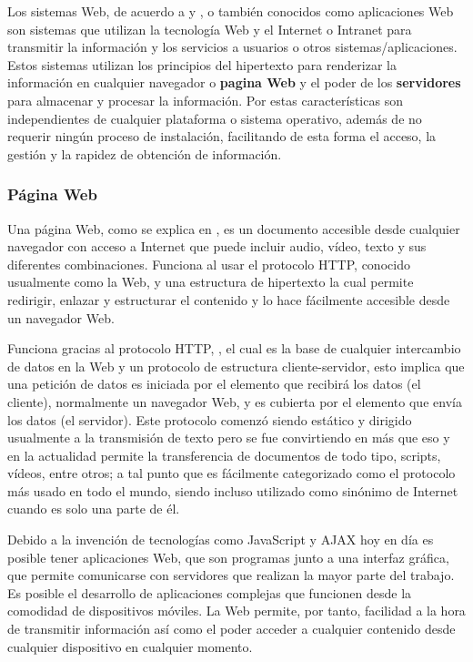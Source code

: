 Los sistemas Web, de acuerdo a \cite{SistWeb1} y \cite{wiki:systemWeb}, o
también conocidos como aplicaciones Web son sistemas que
utilizan la tecnología Web y el Internet o Intranet para transmitir la
información y los
servicios a usuarios o otros sistemas/aplicaciones. Estos sistemas utilizan los
principios del hipertexto para renderizar la información en cualquier
navegador o \textbf{pagina Web} y el poder de los \textbf{servidores} para
almacenar y procesar la información. Por estas características son independientes
de cualquier plataforma o sistema operativo, además de  no requerir ningún
proceso de instalación, facilitando de esta forma el acceso, la gestión y la
rapidez de obtención de información.



\subsubsection*{Página Web}
Una página Web, como se explica en \cite{webpageMozila},  es un documento
accesible desde cualquier navegador con acceso
a Internet que puede incluir audio, vídeo, texto y sus diferentes
combinaciones.
Funciona al usar el protocolo HTTP, conocido usualmente como la Web, y una
estructura de hipertexto la cual permite redirigir, enlazar y estructurar el
contenido y lo hace fácilmente accesible desde un navegador Web.

Funciona gracias al protocolo HTTP, ,
el cual es la base de cualquier intercambio de datos en la Web y un protocolo
de estructura cliente-servidor, esto implica que una petición de datos es
iniciada por el elemento que recibirá los datos (el cliente), normalmente un
navegador Web, y es cubierta por el elemento que envía los datos (el servidor).
Este protocolo comenzó siendo estático y dirigido usualmente a la transmisión de
texto pero se fue convirtiendo en más que eso y en la actualidad permite la
transferencia de documentos de todo tipo, scripts, vídeos, entre otros; a tal
punto que es fácilmente categorizado como el protocolo más usado en todo el
mundo, siendo incluso utilizado como sinónimo de Internet cuando es solo una
parte de él.

Debido a la invención de tecnologías como JavaScript y AJAX hoy en día es
posible tener aplicaciones Web, que son programas junto a una interfaz gráfica,
que permite comunicarse con servidores que realizan la mayor parte del trabajo.
 Es posible el desarrollo de aplicaciones complejas que funcionen desde la
comodidad de dispositivos móviles. La Web permite, por tanto, facilidad a la hora
de transmitir información así como el poder acceder a cualquier contenido desde
cualquier dispositivo en cualquier momento.

